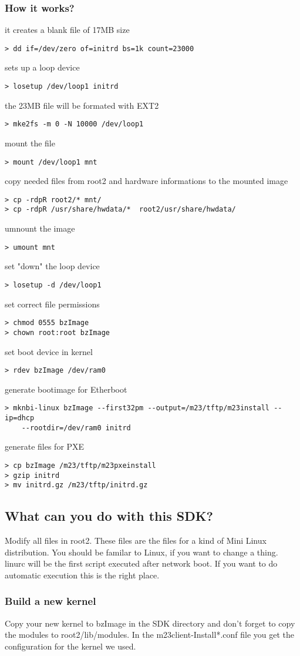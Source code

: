 \subsubsection{How it works?}
it creates a blank file of 17MB size
\begin{verbatim}
> dd if=/dev/zero of=initrd bs=1k count=23000
\end{verbatim}
sets up a loop device
\begin{verbatim}
> losetup /dev/loop1 initrd
\end{verbatim}
the 23MB file will be formated with EXT2
\begin{verbatim}
> mke2fs -m 0 -N 10000 /dev/loop1
\end{verbatim}
mount the file
\begin{verbatim}
> mount /dev/loop1 mnt
\end{verbatim}
copy needed files from root2 and hardware informations to the mounted image
\begin{verbatim}
> cp -rdpR root2/* mnt/
> cp -rdpR /usr/share/hwdata/*  root2/usr/share/hwdata/
\end{verbatim}
umnount the image
\begin{verbatim}
> umount mnt
\end{verbatim}
set "down" the loop device
\begin{verbatim}
> losetup -d /dev/loop1
\end{verbatim}
set correct file permissions
\begin{verbatim}
> chmod 0555 bzImage
> chown root:root bzImage
\end{verbatim}
set boot device in kernel
\begin{verbatim}
> rdev bzImage /dev/ram0
\end{verbatim}
generate bootimage for Etherboot
\begin{verbatim}
> mknbi-linux bzImage --first32pm --output=/m23/tftp/m23install --ip=dhcp
	--rootdir=/dev/ram0 initrd
\end{verbatim}
generate files for PXE
\begin{verbatim}
> cp bzImage /m23/tftp/m23pxeinstall
> gzip initrd
> mv initrd.gz /m23/tftp/initrd.gz
\end{verbatim}

\subsection{What can you do with this SDK?}
Modify all files in root2. These files are the files for a kind of Mini Linux distribution. You should be familar to Linux, if you want to change a thing. linurc will be the first script executed after network boot. If you want to do automatic execution this is the right place. \subsubsection{Build a new kernel}
Copy your new kernel to bzImage in the SDK directory and don't forget to copy the modules to root2/lib/modules. In the m23client-Install*.conf file you get the configuration for the kernel we used.